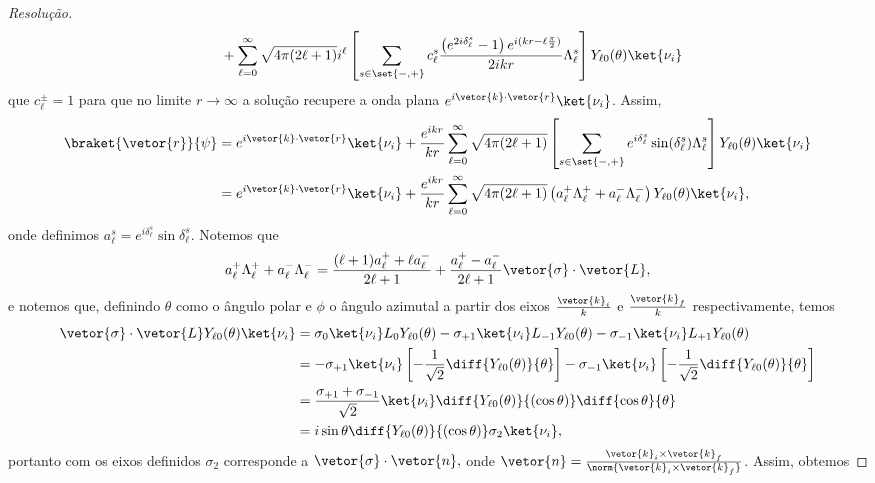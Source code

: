 \begin{proof}[Resolução]
\begin{align*}
      &{}\phantom{\mathop{\sim}^{r\to\infty} + } + \sum_{\ell = 0}^\infty \sqrt{4\pi(2\ell + 1)} i^{\ell} \left[\sum_{s \in\set{-,+}}c_\ell^s \frac{\left(e^{2i \delta_{\ell}^s} - 1\right)e^{i(kr - \ell \frac\pi2)}}{2ikr}\Lambda^s_\ell\right] Y_{\ell 0}(\theta) \ket{\nu_i}
   \end{align*}
   que \(c_\ell^{\pm} = 1\) para que no limite \(r \to \infty\) a solução recupere a onda plana \(e^{i\vetor{k}\cdot\vetor{r}}\ket{\nu_i}\). Assim,
   \begin{align*}
      \braket{\vetor{r}}{\psi} 
      &= e^{i \vetor{k}\cdot\vetor{r}} \ket{\nu_i} + \frac{e^{ikr}}{kr}\sum_{\ell = 0}^\infty \sqrt{4\pi(2\ell + 1)} \left[\sum_{s \in \set{-,+}} e^{i \delta_{\ell}^s}\sin(\delta_{\ell}^s) \Lambda_{\ell}^{s}\right] Y_{\ell 0}(\theta)\ket{\nu_i}\\
      &= e^{i \vetor{k}\cdot\vetor{r}} \ket{\nu_i} + \frac{e^{ikr}}{kr}\sum_{\ell = 0}^\infty \sqrt{4\pi(2\ell + 1)}  \left(a_{\ell}^+ \Lambda_\ell^+ + a_{\ell}^- \Lambda_\ell^-\right)Y_{\ell 0}(\theta)\ket{\nu_i},
   \end{align*}
   onde definimos \(a_{\ell}^s = e^{i \delta_{\ell}^s} \sin\delta_{\ell}^{s}.\) Notemos que
   \begin{equation*}
      a_\ell^+ \Lambda_{\ell}^+ + a_{\ell}^- \Lambda_{\ell}^- = \frac{(\ell + 1)a_{\ell}^+ + \ell a_{\ell}^{-}}{2\ell + 1} + \frac{a_{\ell}^+ - a_{\ell}^{-}}{2\ell + 1} \vetor{\sigma}\cdot\vetor{L},
   \end{equation*}
   e notemos que, definindo \(\theta\) como o ângulo polar e \(\phi\) o ângulo azimutal a partir dos eixos \(\frac{\vetor{k}_i}{k}\) e \(\frac{\vetor{k}_f}{k}\) respectivamente, temos
   \begin{align*}
      \vetor{\sigma}\cdot \vetor{L} Y_{\ell 0}(\theta) \ket{\nu_i} 
      &= \sigma_0\ket{\nu_i} L_0 Y_{\ell 0}(\theta) - \sigma_{+1}\ket{\nu_i} L_{-1} Y_{\ell 0}(\theta) - \sigma_{-1}\ket{\nu_i} L_{+1}Y_{\ell 0}(\theta)\\
      &= - \sigma_{+1}\ket{\nu_i} \left[- \frac{1}{\sqrt{2}}\diff{Y_{\ell 0}(\theta)}{\theta}\right] - \sigma_{-1} \ket{\nu_i} \left[- \frac{1}{\sqrt{2}}\diff{Y_{\ell 0}(\theta)}{\theta}\right]\\
      &= \frac{\sigma_{+1} + \sigma_{-1}}{\sqrt{2}} \ket{\nu_i} \diff{Y_{\ell 0}(\theta)}{(\cos\theta)} \diff{\cos\theta}{\theta}\\
      &= i  \sin\theta\diff{Y_{\ell 0}(\theta)}{(\cos\theta)}\sigma_2 \ket{\nu_i},
   \end{align*}
   portanto com os eixos definidos \(\sigma_2\) corresponde a \(\vetor{\sigma} \cdot \vetor{n},\) onde \(\vetor{n} = \frac{\vetor{k}_i \times \vetor{k}_f}{\norm{\vetor{k}_i\times\vetor{k}_f}}\). Assim, obtemos

\end{proof}
